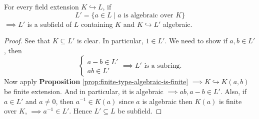\begin{proposition}
	For every field extension \( K \hookrightarrow L \), if
	\[
		L' = \{a\in L \; | \; a \text{ is algebraic over } K \}
	\]
	\( \implies L' \) is a subfield of \( L \) containing \( K \) and \( K \hookrightarrow L' \) algebraic.
\end{proposition}

\begin{proof}
	See that \( K \subseteq L' \) is clear. In particular, \( 1 \in L' \). We need to show if \(
	a,b\in L' \), then
	\[
		\begin{cases}
			a-b \in L' \\
			ab \in L'
		\end{cases}
		\implies L' \text{ is a subring}.
	\]
	Now apply \textbf{Proposition} \ref{prop:finite-type-algebraic-is-finite} \(
	\implies K \hookrightarrow K(a,b) \) be finite extension. And in particular, it is algebraic \(
	\implies ab, a-b \in L' \). Also, if \( a\in L' \) and \( a\ne 0 \), then \( a^{-1}\in K(a) \)
	since \( a \) is algebraic then \( K(a) \) is finite over \( K \), \( \implies a^{-1} \in L' \).
	Hence \( L' \subseteq L \) be subfield.
\end{proof}


